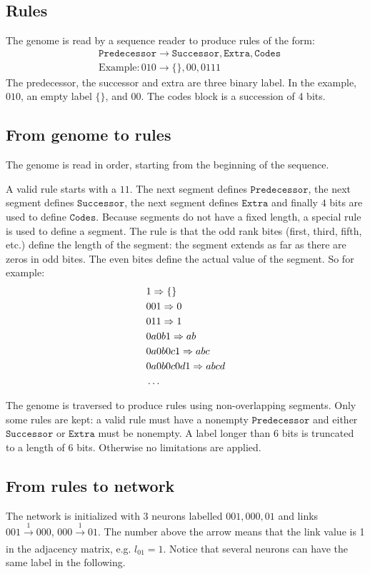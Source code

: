 \documentclass[twocolumn,groupedaddress,floatfix]{article}
\newcommand{\Pred}{\mathtt{Predecessor}}
\newcommand{\Succ}{\mathtt{Successor}}
\newcommand{\Extra}{\mathtt{Extra}}
\newcommand{\Codes}{\mathtt{Codes}}
\begin{document}
\subsection{Rules}
The genome is read by a sequence reader to produce rules of the form:
\begin{align}
&\Pred \rightarrow \Succ, \Extra, \Codes\\
&\textrm{Example}: 010 \rightarrow \{\}, 00, 0111
\end{align}
The predecessor, the successor and extra are three binary label. In the example, $010$, an empty label $\{ \}$, and $00$. The codes block is a succession of 4 bits.

\subsection{From genome to rules}
The genome is read in order, starting from the beginning of the sequence.

A valid rule starts with a $11$.
The next segment defines $\Pred$, the next segment defines $\Succ$, the next segment defines $\Extra$ and finally $4$ bits are used to define $\Codes$.
Because segments do not have a fixed length, a special rule is used to define a segment. The rule is that the odd rank bites (first, third, fifth, etc.) define the length of the segment: the segment extends as far as there are zeros in odd bites. The even bites define the actual value of the segment. So for example:
\begin{align}
&1 \Rightarrow \{\}\\
&001 \Rightarrow 0\\
&011 \Rightarrow 1\\
&0a0b1 \Rightarrow ab\\
&0a0b0c1 \Rightarrow abc\\
&0a0b0c0d1 \Rightarrow abcd \\
&\ldots  \notag 
\end{align}

The genome is traversed to produce rules using non-overlapping segments.
Only some rules are kept: a valid rule must have a nonempty $\Pred$ and either $\Succ$ or $\Extra$ must be nonempty. A label longer than 6 bits is truncated to a length of 6 bits. Otherwise no limitations are applied.

\subsection{From rules to network}
The network is initialized with 3 neurons labelled $001, 000, 01$ and links $001 \xrightarrow[]{1} 000$, $000 \xrightarrow[]{1} 01$. The number above the arrow means that the link value is 1 in the adjacency matrix, e.g. $l_{01} = 1$.
Notice that several neurons can have the same label in the following.
\end{document}
